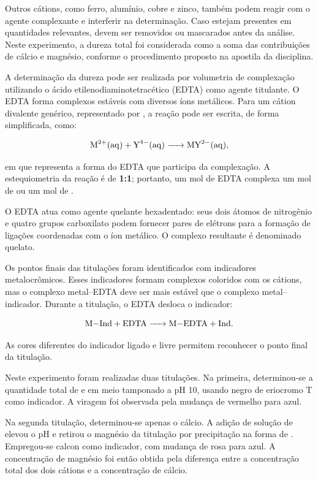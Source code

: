 \documentclass[a4paper,12pt]{article}
\begin{document}
Outros cátions, como ferro, alumínio, cobre e zinco, também podem reagir
com o agente complexante e interferir na determinação. Caso estejam
presentes em quantidades relevantes, devem ser removidos ou mascarados antes
da análise. Neste experimento, a dureza total foi considerada como a soma
das contribuições de cálcio e magnésio, conforme o procedimento proposto na
apostila da disciplina.

A determinação da dureza pode ser realizada por volumetria de complexação
utilizando o ácido etilenodiaminotetracético (EDTA) como agente titulante.
O EDTA forma complexos estáveis com diversos íons metálicos. Para um cátion
divalente genérico, representado por , a reação pode ser escrita,
de forma simplificada, como:

\begin{equation}
\ce{M^2+(aq) + Y^4-(aq) -> MY^2-(aq)},
\end{equation}

em que  representa a forma do EDTA que participa da complexação.
A estequiometria da reação é de \textbf{1:1}; portanto, um mol de EDTA
complexa um mol de  ou um mol de .

O EDTA atua como agente quelante hexadentado: seus dois átomos de nitrogênio
e quatro grupos carboxilato podem fornecer pares de elétrons para a formação
de ligações coordenadas com o íon metálico. O complexo resultante é
denominado quelato.

Os pontos finais das titulações foram identificados com indicadores
metalocrômicos. Esses indicadores formam complexos coloridos com os cátions,
mas o complexo metal--EDTA deve ser mais estável que o complexo
metal--indicador. Durante a titulação, o EDTA desloca o indicador:

\begin{equation}
\ce{M-Ind + EDTA -> M-EDTA + Ind}.
\end{equation}

As cores diferentes do indicador ligado e livre permitem reconhecer o ponto
final da titulação.

Neste experimento foram realizadas duas titulações. Na primeira,
determinou-se a quantidade total de  e  em meio
tamponado a pH 10, usando negro de eriocromo T como indicador. A viragem foi
observada pela mudança de vermelho para azul.

Na segunda titulação, determinou-se apenas o cálcio. A adição de solução de
 elevou o pH e retirou o magnésio da titulação por precipitação na
forma de . Empregou-se calcon como indicador, com mudança de
rosa para azul. A concentração de magnésio foi então obtida pela diferença
entre a concentração total dos dois cátions e a concentração de cálcio.
\end{document}
